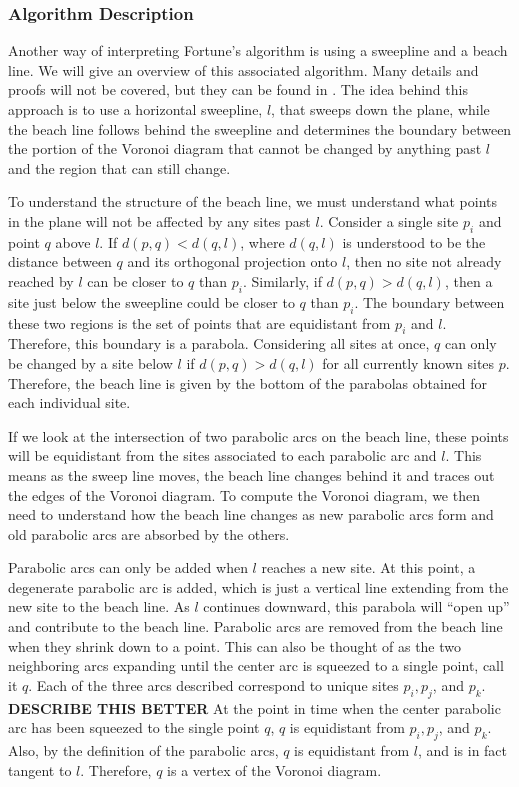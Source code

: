 \documentclass[a4paper, 11pt]{article}
\begin{document}
\subsubsection{Algorithm Description}
Another way of interpreting Fortune's algorithm is using a sweepline and a beach line. We will give an overview of this associated algorithm. Many
details and proofs will not be covered, but they can be found in \cite{comp_geom}. The idea behind this approach is to use a
horizontal sweepline, $l$, that sweeps down the plane, while the beach line follows behind the sweepline and determines the boundary between the portion of the Voronoi diagram that cannot be
changed by anything past $l$ and the region that can still change.

To understand the structure of the beach line, we must understand what points in the plane will not be affected by any sites past $l$.
Consider a single site $p_i$ and point $q$ above $l$. If $d(p,q) < d(q,l)$, where $d(q,l)$ is understood to be the distance between $q$ and its
orthogonal projection onto $l$, then
no site not already reached by $l$ can be closer to $q$ than $p_i$. Similarly, if $d(p,q) > d(q,l)$, then a site just
below the sweepline could be closer to $q$ than $p_i$. The boundary between these two regions is the set of points that are equidistant from $p_i$ and
$l$. Therefore, this boundary is a parabola. Considering all sites at once, $q$ can only be changed by a site below $l$ if $d(p,q) > d(q,l)$ for all
currently known sites $p$. Therefore, the beach line is given by the bottom of the parabolas obtained for each individual site.

If we look at the intersection of two parabolic arcs on the beach line, these points will be equidistant from the sites associated to each parabolic
arc and $l$. This means as the sweep line moves, the beach line changes behind it and traces out the edges of the Voronoi diagram. To compute the
Voronoi diagram, we then need to understand how the beach line changes as new parabolic arcs form and old parabolic arcs are absorbed by the others.

Parabolic arcs can only be added when $l$ reaches a new site. At this point, a degenerate parabolic arc is added, which is just a vertical line
extending from the new site to the beach line. As $l$ continues downward, this parabola will ``open up'' and contribute to the beach line. Parabolic
arcs are removed from the beach line when they shrink down to a point. This can also be thought of as the two neighboring arcs expanding until the
center arc is squeezed to a single point, call it $q$. Each of the three arcs described correspond to unique sites $p_i, p_j$, and $p_k$.
\textbf{DESCRIBE THIS BETTER} At the point in time when the center parabolic arc has been squeezed to the single point $q$, $q$ is equidistant from
$p_i, p_j$, and $p_k$. Also, by the definition of the parabolic arcs, $q$ is equidistant from $l$, and is in fact tangent to $l$. Therefore, $q$ is a
vertex of the Voronoi diagram.
\end{document}
